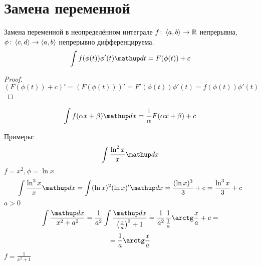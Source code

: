 ﻿\section{Замена переменной}
\begin{theorem}{Замена переменной в неопределённом интеграле}
$f\colon \left<a, b\right> \rightarrow \mathbb{R}$ непрерывна, $\phi\colon \left<c, d\right> \rightarrow \left<a, b\right>$ непрерывно дифференцируема.
$$\int f(\phi(t)) \phi'(t) \d t = F(\phi(t)) + c$$
\end{theorem}
\begin{proof}
$$\left(F(\phi(t)) + c\right)' = (F(\phi(t)))' = F'(\phi(t)) \phi'(t) = f(\phi(t)) \phi'(t)$$
\end{proof}
\begin{conseq}
$$\int f(\alpha x + \beta) \d x = \frac1{\alpha}F(\alpha x + \beta) + c$$
\end{conseq}

Примеры:
$$\int \frac{\ln^2 x}{x}\d x$$
$f = x^2, \phi = \ln x$
$$\int \frac{\ln^2 x}{x} \d x = \int (\ln x)^2 (\ln x)' \d x = \frac{(\ln x)^3}3 + c = \frac{\ln^3 x}3 + c$$
$a>0$
$$\int \frac{\d x}{x^2 + a^2} = \frac1{a^2} \int \frac{\d x}{\left(\frac{x}a\right)^2 + 1} = \frac1{a^2} \frac1{\frac1a} \arctg \frac{x}a + c=$$
$$= \frac1a \arctg \frac{x}a$$
$f=\frac1{x^2+1}$

